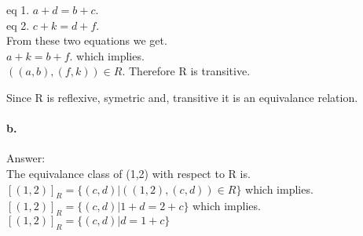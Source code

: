 \documentclass[11pt]{article}
\begin{document}
    eq 1. $a+d = b+c$.\\
    
    eq 2. $c+k = d+f$.\\
    
    From these two equations we get.\\
    
    $a+k = b+f$. which implies.\\
    
    $((a,b),(f,k)) \in R$. Therefore R is transitive.
    
    Since R is reflexive, symetric and, transitive it is an equivalance relation.\\

\paragraph{b.}
Answer: \\

    The equivalance class of (1,2) with respect to R is.\\
    
    $[(1,2)]_R = \{(c,d) | ((1,2),(c,d)) \in R\}$ which implies.\\
    
    $[(1,2)]_R = \{(c,d) | 1 + d = 2 + c\}$ which implies.\\
    
    $[(1,2)]_R = \{(c,d) | d = 1 + c\}$
\end{document}
